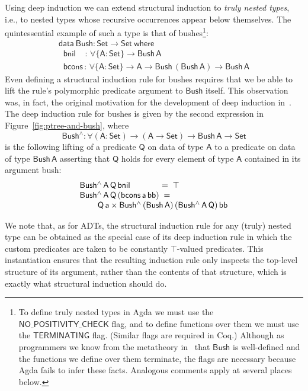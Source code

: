 \documentclass[sigplan,10pt]{acmart}
\begin{document}
Using deep induction we can extend structural induction to {\em truly
  nested types}, i.e., to nested types whose recursive occurrences
appear below themselves. The quintessential example of such a type is
that of bushes\footnote{To define truly nested types in Agda we must
  use the $\mathsf{NO\_POSITIVITY\_CHECK}$ flag, and to define
  functions over them we must use the $\mathsf{TERMINATING}$ flag.
  (Similar flags are required in Coq.) Although as programmers we know
  from the metatheory in~\cite{jp19} that $\mathsf{Bush}$ is
  well-defined and the functions we define over them terminate, the
  flags are necessary because Agda fails to infer these
  facts. Analogous comments apply at several places
  below.}\cite{bm98}:
\begin{equation*}\label{eq:bush}
\begin{array}{l}
\mathsf{data\ Bush : Set \to Set\ where}\\
\mathsf{\;\;bnil\,\,\,\,\,\; :\, \forall \{A : Set\} \to Bush\,A}\\
\mathsf{\;\;bcons\, :\, \forall \{A : Set\} \to A \to Bush\,(Bush\,A) \to Bush\,A} 
\end{array}
\end{equation*}
Even defining a structural induction rule for bushes requires that we
be able to lift the rule's polymorphic predicate argument to
$\mathsf{Bush}$ itself. This observation was, in fact, the original
motivation for the development of deep induction in~\cite{jp20}. The
deep induction rule for bushes is given by the second expression in
Figure~\ref{fig:ptree-and-bush}, where
\[\mathsf{Bush^{\wedge} :
  \forall (A : Set) \to (A \to Set) \to Bush\,A \to Set}\]
is the following lifting of a predicate $\mathsf{Q}$ on data of type
$\mathsf{A}$ to a predicate on data of type $\mathsf{Bush\,A}$
asserting that $\mathsf{Q}$ holds for every element of type
$\mathsf{A}$ contained in its argument bush:
\begin{equation}
\begin{array}{l}
\mathsf{Bush^{\wedge}\,A\,Q\,bnil} \hspace*{0.49in} = \; \mathsf{\top} \\
\mathsf{Bush^{\wedge}\,A\,Q\,(bcons\,a\,bb)} \; = \;\\
\hspace*{0.3in}\mathsf{Q\,a \times Bush^{\wedge}\,(Bush\,A)\,(Bush^{\wedge}\,A\,Q)\,bb} 
\end{array}
\end{equation}

We note that, as for ADTs, the structural induction rule for any
(truly) nested type can be obtained as the special case of its deep
induction rule in which the custom predicates are taken to be
constantly $\mathsf{\top}$-valued predicates. This instantiation
ensures that the resulting induction rule only inspects the top-level
structure of its argument, rather than the contents of that structure,
which is exactly what structural induction should do.
\end{document}
